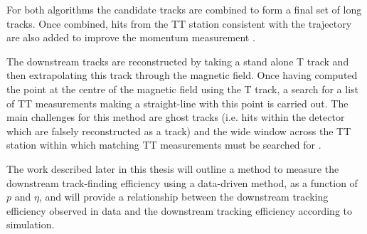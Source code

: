 
For both algorithms the candidate tracks are combined to form a final set of long tracks. Once combined, hits from the TT station consistent with the trajectory are also added to improve the momentum measurement \cite{tracks}. %

The downstream tracks are reconstructed by taking a stand alone T track and then extrapolating this track through the magnetic field. Once having computed the point at the centre of the magnetic field using the T track, a search for a list of TT measurements making a straight-line with this point is carried out. The main challenges for this method are \gls{ghost} tracks (i.e. hits within the detector which are falsely reconstructed as a track) and the wide window across the TT station within which matching TT measurements must be searched for \cite{downstream}.


The work described later in this thesis will outline a method to measure the downstream track-finding efficiency using a data-driven method, as a function of $p$ and $\eta$, and will provide a relationship between the downstream tracking efficiency observed in data and the downstream tracking efficiency according to simulation.


